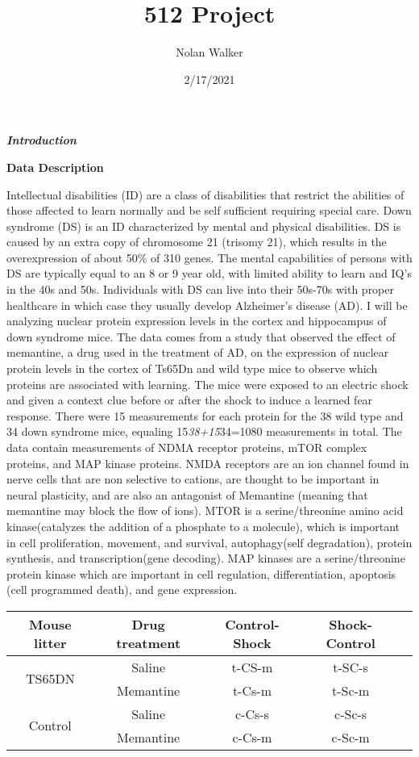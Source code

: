 \documentclass[
]{article}
\title{512 Project}
\author{Nolan Walker}
\date{2/17/2021}
\begin{document}
\maketitle

\textbf{\emph{Introduction}}

\textbf{Data Description}

Intellectual disabilities (ID) are a class of disabilities that restrict
the abilities of those affected to learn normally and be self sufficient
requiring special care. Down syndrome (DS) is an ID characterized by
mental and physical disabilities. DS is caused by an extra copy of
chromosome 21 (trisomy 21), which results in the overexpression of about
50\% of 310 genes. The mental capabilities of persons with DS are
typically equal to an 8 or 9 year old, with limited ability to learn and
IQ's in the 40s and 50s. Individuals with DS can live into their 50s-70s
with proper healthcare in which case they usually develop Alzheimer's
disease (AD). I will be analyzing nuclear protein expression levels in
the cortex and hippocampus of down syndrome mice. The data comes from a
study that observed the effect of memantine, a drug used in the
treatment of AD, on the expression of nuclear protein levels in the
cortex of Ts65Dn and wild type mice to observe which proteins are
associated with learning. The mice were exposed to an electric shock and
given a context clue before or after the shock to induce a learned fear
response. There were 15 measurements for each protein for the 38 wild
type and 34 down syndrome mice, equaling 15\emph{38+15}34=1080
measurements in total. The data contain measurements of NDMA receptor
proteins, mTOR complex proteins, and MAP kinase proteins. NMDA receptors
are an ion channel found in nerve cells that are non selective to
cations, are thought to be important in neural plasticity, and are also
an antagonist of Memantine (meaning that memantine may block the flow of
ions). MTOR is a serine/threonine amino acid kinase(catalyzes the
addition of a phosphate to a molecule), which is important in cell
proliferation, movement, and survival, autophagy(self degradation),
protein synthesis, and transcription(gene decoding). MAP kinases are a
serine/threonine protein kinase which are important in cell regulation,
differentiation, apoptosis (cell programmed death), and gene expression.

\begin{center}
\begin{tabular}{ |c|c|c|c|c| } 
\hline
Mouse litter & Drug treatment & Control-Shock & Shock-Control \\
\hline
\multirow{2}{4em}{TS65DN} & Saline & t-CS-m & t-SC-s \\
\hline
& Memantine & t-Cs-m & t-Sc-m \\
\hline
\multirow{2}{4em}{Control}& Saline & c-Cs-s & c-Sc-s\\ 
\hline
& Memantine & c-Cs-m & c-Sc-m\\
\hline
\end{tabular}
\end{center}
\end{document}
